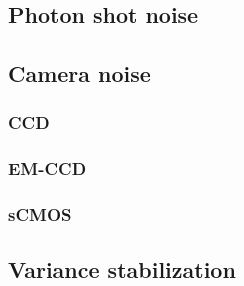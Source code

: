   \subsection{Photon shot noise}
  \subsection{Camera noise}
    \subsubsection{CCD}
    \subsubsection{EM-CCD}
    \subsubsection{sCMOS}
  \subsection{Variance stabilization}
  
